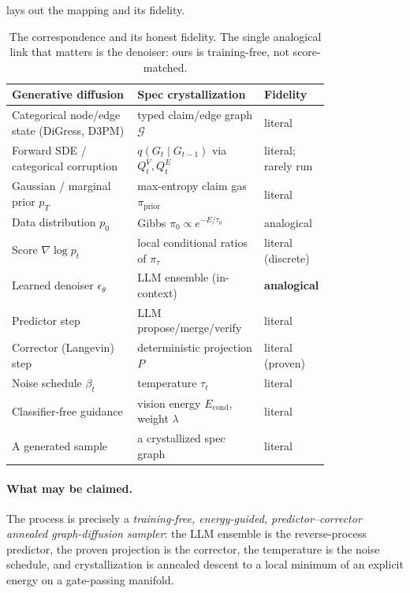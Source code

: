 \documentclass[11pt,letterpaper]{article}
\theoremstyle{plain}
\theoremstyle{definition}
\newcommand{\prior}{\pi_{\mathrm{prior}}}
\newcommand{\Graphs}{\mathcal{G}}
\newcommand{\Proj}{P}
\begin{document}
 lays out the mapping and its fidelity.

\begin{table}[t]
\centering
\small
\renewcommand{\arraystretch}{1.18}
\begin{tabular}{@{}p{0.40\linewidth} p{0.40\linewidth} l@{}}
\toprule
\textbf{Generative diffusion} & \textbf{Spec crystallization} & \textbf{Fidelity} \\
\midrule
Categorical node/edge state (DiGress, D3PM) & typed claim/edge graph $\Graphs$ & literal \\
Forward SDE / categorical corruption & $q(G_t\mid G_{t-1})$ via $Q^V_t,Q^E_t$ & literal; rarely run \\
Gaussian / marginal prior $p_T$ & max-entropy claim gas $\prior$ & literal \\
Data distribution $p_0$ & Gibbs $\pi_0\propto e^{-E/\tau_0}$ & analogical \\
Score $\nabla\log p_t$ & local conditional ratios of $\pi_\tau$ & literal (discrete) \\
Learned denoiser $\epsilon_\theta$ & LLM ensemble (in-context) & \textbf{analogical} \\
Predictor step & LLM propose/merge/verify & literal \\
Corrector (Langevin) step & deterministic projection $\Proj$ & literal (proven) \\
Noise schedule $\beta_t$ & temperature $\tau_t$ & literal \\
Classifier-free guidance & vision energy $E_{\mathrm{cond}}$, weight $\lambda$ & literal \\
A generated sample & a crystallized spec graph & literal \\
\bottomrule
\end{tabular}
\caption{The correspondence and its honest fidelity. The single analogical link
that matters is the denoiser: ours is training-free, not score-matched.}
\label{tab:corr}
\end{table}

\paragraph{What may be claimed.} The process is precisely a \emph{training-free,
energy-guided, predictor--corrector annealed graph-diffusion sampler}: the LLM
ensemble is the reverse-process predictor, the proven projection is the corrector,
the temperature is the noise schedule, and crystallization is annealed descent to a
local minimum of an explicit energy on a gate-passing manifold.
\end{document}
